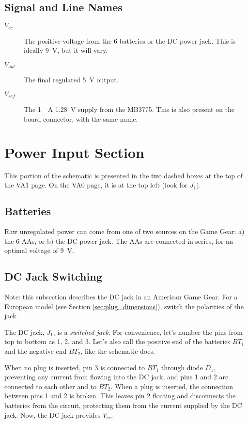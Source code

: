 \documentclass{article}
\newcommand{\Vcc}{$V_{cc}$}
\newcommand{\Vout}{$V_{out}$}
\newcommand{\Vref}{$V_{ref}$}
\newcommand{\model}{\textsf}
\begin{document}
\subsection{Signal and Line Names}
\begin{description}
\item[\Vcc{}] The positive voltage from the 6 batteries or the DC power
  jack. This is ideally \qty{9}{\volt}, but it will vary.
\item[\Vout{}] The final regulated \qty{5}{\volt} output.
\item[\Vref{}] The \qty{1}{\milli{}A} \qty{1.28}{\volt} supply from
  the \model{MB3775}. This is also present on the board connector,
  with the same name.
\end{description}

\section{Power Input Section}
This portion of the schematic is presented in the two dashed boxes at
the top of the \model{VA1} page. On the \model{VA0} page, it is at the
top left (look for $J_1$).

\subsection{Batteries}
Raw unregulated power can come from one of two sources on the Game
Gear: a) the 6 AAs, or b) the DC power jack. The AAs are connected
in series, for an optimal voltage of \qty{9}{\volt}.


\subsection{DC Jack Switching}
Note: this subsection describes the DC jack in an American Game
Gear. For a European model (see Section \ref{sec:plug_dimensions}),
switch the polarities of the jack.

The DC jack, $J_1$, is a \textit{switched jack}. For convenience,
let's number the pins from top to bottom as 1, 2, and 3. Let's also
call the positive end of the batteries $BT_1$ and the negative end
$BT_2$, like the schematic does.

When no plug is inserted, pin 3 is connected to $BT_1$ through diode
$D_1$, preventing any current from flowing into the DC jack, and pins
1 and 2 are connected to each other and to $BT_2$. When a plug is
inserted, the connection between pins 1 and 2 is broken. This leaves
pin 2 floating and disconnects the batteries from the circuit,
protecting them from the current supplied by the DC jack. Now, the DC
jack provides \Vcc{}.
\end{document}
